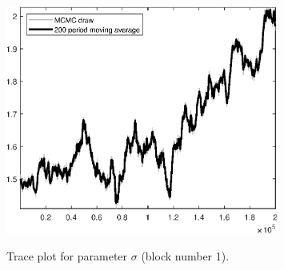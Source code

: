 \begin{figure}[H]
\centering
  \includegraphics[width=0.8\textwidth]{BRS_sectoral_rest/graphs/TracePlot_sigma_blck_1}\\
    \caption{Trace plot for parameter ${\sigma}$ (block number 1).}
\end{figure}
